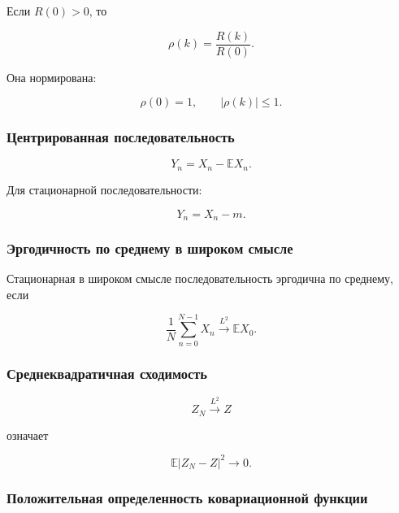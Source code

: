 \documentclass[
  11pt,
  a4paper,
]{article}
\begin{document}
Если \(R(0)>0\), то

\[
\rho(k)=\frac{R(k)}{R(0)}.
\]

Она нормирована:

\[
\rho(0)=1,
\qquad
|\rho(k)|\le1.
\]

\subsubsection{Центрированная
последовательность}\label{ux446ux435ux43dux442ux440ux438ux440ux43eux432ux430ux43dux43dux430ux44f-ux43fux43eux441ux43bux435ux434ux43eux432ux430ux442ux435ux43bux44cux43dux43eux441ux442ux44c}

\[
Y_n=X_n-\mathbb EX_n.
\]

Для стационарной последовательности:

\[
Y_n=X_n-m.
\]

\subsubsection{Эргодичность по среднему в широком
смысле}\label{ux44dux440ux433ux43eux434ux438ux447ux43dux43eux441ux442ux44c-ux43fux43e-ux441ux440ux435ux434ux43dux435ux43cux443-ux432-ux448ux438ux440ux43eux43aux43eux43c-ux441ux43cux44bux441ux43bux435}

Стационарная в широком смысле последовательность эргодична по среднему,
если

\[
\frac1N\sum_{n=0}^{N-1}X_n
\xrightarrow{L^2}
\mathbb EX_0.
\]

\subsubsection{Среднеквадратичная
сходимость}\label{ux441ux440ux435ux434ux43dux435ux43aux432ux430ux434ux440ux430ux442ux438ux447ux43dux430ux44f-ux441ux445ux43eux434ux438ux43cux43eux441ux442ux44c}

\[
Z_N\xrightarrow{L^2}Z
\]

означает

\[
\mathbb E|Z_N-Z|^2\to0.
\]

\subsubsection{Положительная определенность ковариационной
функции}\label{ux43fux43eux43bux43eux436ux438ux442ux435ux43bux44cux43dux430ux44f-ux43eux43fux440ux435ux434ux435ux43bux435ux43dux43dux43eux441ux442ux44c-ux43aux43eux432ux430ux440ux438ux430ux446ux438ux43eux43dux43dux43eux439-ux444ux443ux43dux43aux446ux438ux438}
\end{document}
